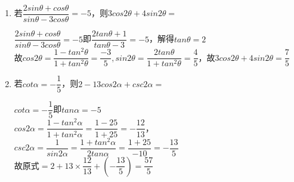 \begin{enumerate}
\begin{enumerate}
\begin{jieda}
            得证。
        \end{jieda}
        \item 若$\dfrac{2sin\theta + cos\theta}{sin\theta - 3cos\theta} = -5$，则$3cos2\theta + 4sin2\theta = $
        \begin{jieda}
            $\dfrac{2sin\theta + cos\theta}{sin\theta - 3cos\theta} = -5$即$\dfrac{2tan\theta + 1}{tan\theta - 3} = -5$，解得$tan\theta = 2$ \\
            故$cos2\theta = \dfrac{1-tan^2\theta}{1+tan^2\theta} = \dfrac{-3}{5}, sin2\theta = \dfrac{2tan\theta}{1+tan^2\theta} = \dfrac{4}{5}$，故$3cos2\theta + 4sin2\theta = \dfrac{7}{5}$
        \end{jieda}
        \item 若$cot\alpha = -\dfrac{1}{5}$，则$2 - 13cos2\alpha + csc2\alpha = $
        \begin{jieda}
            $cot\alpha = -\dfrac{1}{5}$即$tan\alpha = -5$ \\
            $cos2\alpha = \dfrac{1-tan^2\alpha}{1+tan^2\alpha} = \dfrac{1-25}{1+25} = -\dfrac{12}{13}$，$csc2\alpha = \dfrac{1}{sin2\alpha} = \dfrac{1+tan^2\alpha}{2tan\alpha} = \dfrac{1+25}{-10} = -\dfrac{13}{5}$ \\
            故原式$ = 2 + 13 \times \dfrac{12}{13} + (-\dfrac{13}{5}) = \dfrac{57}{5}$
        \end{jieda}


\end{enumerate}
\end{enumerate}
